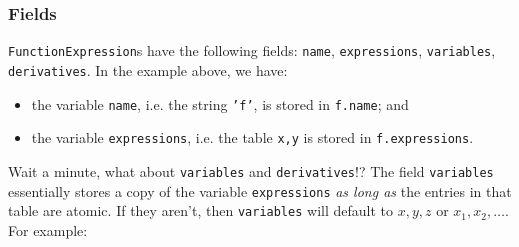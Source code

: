 \documentclass{article}
\begin{document}
\subsubsection*{Fields}
\texttt{FunctionExpression}s have the following fields: \texttt{name}, \texttt{expressions}, \texttt{variables}, \texttt{derivatives}. In the example above, we have:
\begin{itemize}
    \item the variable \texttt{name}, i.e. the string \texttt{'f'}, is stored in \texttt{f.name}; and
    \item the variable \texttt{expressions}, i.e. the table \texttt{{x,y}} is stored in \texttt{f.expressions}.
\end{itemize}
Wait a minute, what about \texttt{variables} and \texttt{derivatives}!? The field \texttt{variables} essentially stores a copy of the variable \texttt{expressions} \textit{as long as} the entries in that table are atomic. If they aren't, then \texttt{variables} will default to $x,y,z$ or $x_1,x_2,\ldots$. For example:
\end{document}

